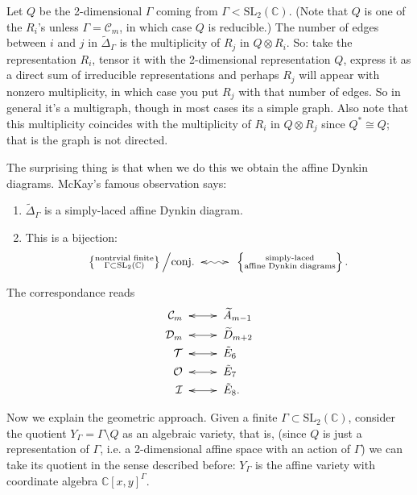 Let $Q$ be the 2-dimensional $\Gamma$ coming from
$\Gamma<\text{SL}_2(\mathbb{C})$.
(Note that $Q$ is one of the $R_i$'s unless $\Gamma=\mathcal{C}_m$,
in which case $Q$ is reducible.)
The number of edges between $i$ and $j$ in $\tilde{\Delta}_\Gamma$ 
is the multiplicity of $R_j$ in $Q \otimes R_i$.
So: take the representation $R_i$, tensor it with the
2-dimensional representation $Q$, 
express it as a direct sum of irreducible representations
and perhaps $R_j$ will appear with nonzero multiplicity,
in which case you put $R_j$ with that number of edges.
So in general it's a multigraph, though in most
cases its a simple graph.
Also note that this multiplicity coincides
with the multiplicity of $R_i$ in $Q \otimes R_j$
since $Q^* \cong Q$; that is the graph is not directed.

The surprising thing is that when we do this we obtain
the affine Dynkin diagrams. McKay's famous observation says:
\begin{enumerate}
\item $\tilde{\Delta}_\Gamma$ is a simply-laced affine Dynkin
diagram.

\item This is a bijection:
$$
\left\{\substack{\text{nontrvial finite} \\ \Gamma \subset
\text{SL}_2(\mathbb{C})}\right\}\Big/\text{conj.}
\xymatrix{\ar@{<~>}[r]&}
\left\{\substack{\text{simply-laced} \\ \text{affine Dynkin diagrams}}\right\}.
$$
\end{enumerate}

\noindent
The correspondance reads
\begin{align*}
\mathcal{C}_m &\xymatrix{\ar@{<->}[r]&}
\widetilde{A}_{m-1}\\
\mathcal{D}_m &\xymatrix{\ar@{<->}[r]&}
\widetilde{D}_{m+2}\\
\mathcal{T}&\xymatrix{\ar@{<->}[r]&}\tilde{E}_6\\
\mathcal{O}&\xymatrix{\ar@{<->}[r]&}\tilde{E}_7\\
\mathcal{I}&\xymatrix{\ar@{<->}[r]&}\tilde{E}_8.
\end{align*}

\medskip\noindent
Now we explain the geometric approach.
Given a finite $\Gamma \subset \text{SL}_2(\mathbb{C})$, consider
the quotient $Y_\Gamma=\Gamma\setminus Q$ as an algebraic variety,
that is, (since $Q$ is just a representation of $\Gamma$, i.e.
a 2-dimensional affine space with an action of $\Gamma$)
we can take its quotient in the sense described before:
$Y_\Gamma$ is the affine variety with coordinate algebra
$\mathbb{C}[x,y]^\Gamma$.

